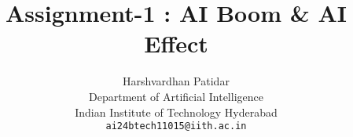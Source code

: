 \documentclass{article}
\title{Assignment-1 : AI Boom \& AI Effect}
\author{Harshvardhan Patidar\\
  Department of Artificial Intelligence\\
  Indian Institute of Technology Hyderabad\\
  \texttt{ai24btech11015@iith.ac.in}
}
\begin{document}
\



\maketitle






















\end{document}
